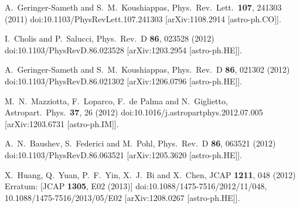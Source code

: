 \documentclass[12pt,prd,showpacs,amsmath,amssymb,aps,floats,floatfix,nofootinbib]{revtex4-1}
\begin{document}
\begin{thebibliography}{99}
  A.~Geringer-Sameth and S.~M.~Koushiappas,
  Phys.\ Rev.\ Lett.\  {\bf 107}, 241303 (2011)
  doi:10.1103/PhysRevLett.107.241303
  [arXiv:1108.2914 [astro-ph.CO]].

  I.~Cholis and P.~Salucci,
  Phys.\ Rev.\ D {\bf 86}, 023528 (2012)
  doi:10.1103/PhysRevD.86.023528
  [arXiv:1203.2954 [astro-ph.HE]].

  A.~Geringer-Sameth and S.~M.~Koushiappas,
  Phys.\ Rev.\ D {\bf 86}, 021302 (2012)
  doi:10.1103/PhysRevD.86.021302
  [arXiv:1206.0796 [astro-ph.HE]].

  M.~N.~Mazziotta, F.~Loparco, F.~de Palma and N.~Giglietto,
  Astropart.\ Phys.\  {\bf 37}, 26 (2012)
  doi:10.1016/j.astropartphys.2012.07.005
  [arXiv:1203.6731 [astro-ph.IM]].

  A.~N.~Baushev, S.~Federici and M.~Pohl,
  Phys.\ Rev.\ D {\bf 86}, 063521 (2012)
  doi:10.1103/PhysRevD.86.063521
  [arXiv:1205.3620 [astro-ph.HE]].

  X.~Huang, Q.~Yuan, P.~F.~Yin, X.~J.~Bi and X.~Chen,
  JCAP {\bf 1211}, 048 (2012)
  Erratum: [JCAP {\bf 1305}, E02 (2013)]
  doi:10.1088/1475-7516/2012/11/048, 10.1088/1475-7516/2013/05/E02
  [arXiv:1208.0267 [astro-ph.HE]].


\end{thebibliography}
\end{document}
